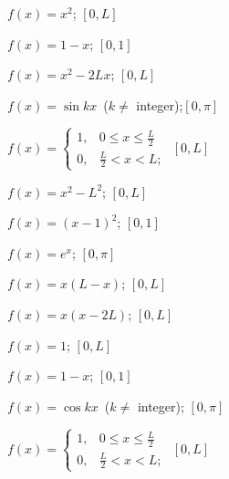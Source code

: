 \begin{exerciselist}

\item\label{exer:11.3.1}$f(x)=x^2$;  \quad $[0,L]$

\item\label{exer:11.3.2}\Cex $f(x)=1-x$;   \quad $[0,1]$

\item\label{exer:11.3.3}\Cex
$f(x)=x^2-2Lx$;   \quad $[0,L]$

\item\label{exer:11.3.4}$f(x)=\sin kx$\, ($k\ne$ integer);\quad    $[0,\pi]$

\item\label{exer:11.3.5}\Cex
$f(x)=
\begin{cases}
1,&0\le x\le\frac{L}{2}\\0,&\frac{L}{2}<x<L;
\end{cases}$ \quad $[0,L]$

\item\label{exer:11.3.6}$f(x)=x^2-L^2$;   \quad $[0,L]$



\item\label{exer:11.3.7}$f(x)=(x-1)^2$;  \quad $[0,1]$


\item\label{exer:11.3.8}$f(x)=e^x$;   \quad $[0,\pi]$


\item\label{exer:11.3.9}\Cex
$f(x)=x(L-x)$;  \quad $[0,L]$


\item\label{exer:11.3.10}\Cex
$f(x)=x(x-2L)$;  \quad $[0,L]$



\item\label{exer:11.3.11}\Cex
$f(x)=1$;  \quad$[0,L]$


\item\label{exer:11.3.12}\Cex $f(x)=1-x$;   \quad $[0,1]$


\item\label{exer:11.3.13}$f(x)=\cos kx$\, ($k\ne$ integer);  \quad $[0,\pi]$

\item\label{exer:11.3.14}\Cex
$f(x)=
\begin{cases}
1,&0\le x\le\frac{L}{2}\\0,&\frac{L}{2}<x<L;
\end{cases}$ \quad $[0,L]$



\end{exerciselist}
